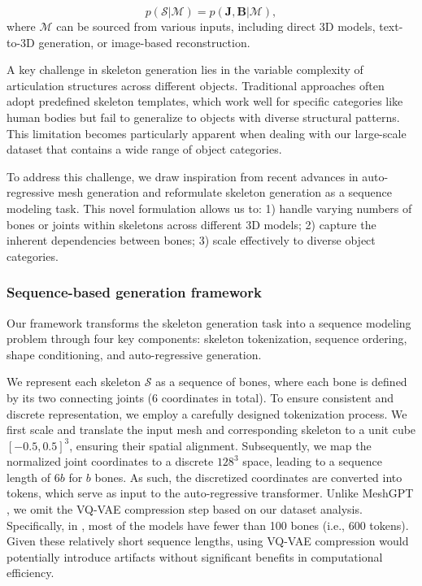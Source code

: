 \begin{equation} \mathit{p}(\mathcal{S} | \mathcal{M}) = \mathit{p}(\mathbf{J}, \mathbf{B} | \mathcal{M}), \end{equation}
where $\mathcal{M}$ can be sourced from various inputs, including direct 3D models, text-to-3D generation, or image-based reconstruction.

A key challenge in skeleton generation lies in the variable complexity of articulation structures across different objects. Traditional approaches \cite{baran2007automatic, li2021learning} often adopt predefined skeleton templates, which work well for specific categories like human bodies but fail to generalize to objects with diverse structural patterns. 
This limitation becomes particularly apparent when dealing with our large-scale dataset that contains a wide range of object categories.


To address this challenge, we draw inspiration from recent advances in auto-regressive mesh generation \cite{siddiqui2024meshgpt, chen2024meshanythingv2} and reformulate skeleton generation as a sequence modeling task. This novel formulation allows us to:
1) handle varying numbers of bones or joints within skeletons across different 3D models;
2) capture the inherent dependencies between bones;
3) scale effectively to diverse object categories.

\subsubsection{Sequence-based generation framework}
Our framework transforms the skeleton generation task into a sequence modeling problem through four key components: skeleton tokenization, sequence ordering, shape conditioning, and auto-regressive generation. 

We represent each skeleton $\mathcal{S}$ as a sequence of bones, where each bone is defined by its two connecting joints ($6$ coordinates in total). To ensure consistent and discrete representation, we employ a carefully designed tokenization process. 
We first scale and translate the input mesh and corresponding skeleton to a unit cube $[-0.5, 0.5]^3$, ensuring their spatial alignment. 
Subsequently, we map the normalized joint coordinates to a discrete $128^3$ space, leading to a sequence length of $6b$ for $b$ bones. 
As such, the discretized coordinates are converted into tokens, which serve as input to the auto-regressive transformer.
Unlike MeshGPT \cite{siddiqui2024meshgpt}, we omit the VQ-VAE compression step based on our dataset analysis. Specifically, in \ourdata{}, most of the models have fewer than 100 bones (i.e., 600 tokens). 
Given these relatively short sequence lengths, using VQ-VAE compression would potentially introduce artifacts without significant benefits in computational efficiency.

